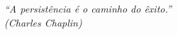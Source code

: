 \begin{epigrafe}
    \vspace*{\fill}
	\begin{flushright}
		\textit{``A persistência é o caminho do êxito.'' \\
		(Charles Chaplin)}
	\end{flushright}
\end{epigrafe}